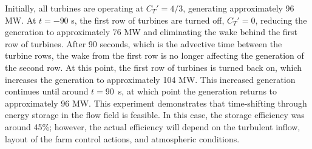 Initially, all turbines are operating at $C_T' = 4/3$, generating approximately 96 MW. At $t=-90$ s, the first row of turbines are turned off, $C_T' = 0$, reducing the generation to approximately 76 MW and eliminating the wake behind the first row of turbines. After 90 seconds, which is the advective time between the turbine rows, the wake from the first row is no longer affecting the generation of the second row. At this point, the first row of turbines is turned back on, which increases the generation to approximately 104 MW. This increased generation continues until around $t = 90$~s, at which point the generation returns to approximately 96 MW. This experiment demonstrates that time-shifting through energy storage in the flow field is feasible. In this case, the storage efficiency was around 45\%; however, the actual efficiency will depend on the turbulent inflow, layout of the farm control actions, and atmospheric conditions.

